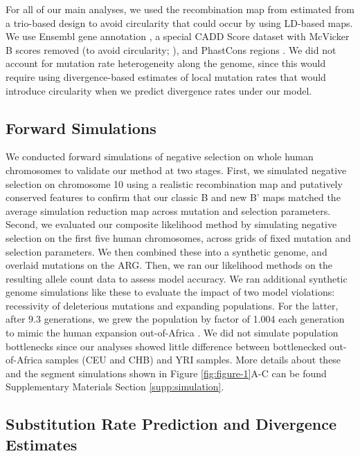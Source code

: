 \documentclass[11pt]{article}
\begin{document}
For all of our main analyses, we used the recombination map from
\textcite{Halldorsson2019-ey} estimated from a trio-based design to avoid
circularity that could occur by using LD-based maps. We use Ensembl gene
annotation \parencite{Cunningham2022-vk}, a special CADD Score dataset with
McVicker B scores removed (to avoid circularity;
\cite{Kircher2014-bv,Rentzsch2019-lr}), and PhastCons regions
\parencite{Siepel2005-wh}. We did not account for mutation rate heterogeneity
along the genome, since this would require using divergence-based estimates of
local mutation rates that would introduce circularity when we predict
divergence rates under our model.

\subsection*{Forward Simulations}
\label{sec:methods-sim}

We conducted forward simulations of negative selection on whole human
chromosomes to validate our method at two stages. First, we simulated negative
selection on chromosome 10 using a realistic recombination map and putatively
conserved features to confirm that our classic B and new B' maps matched the
average simulation reduction map across mutation and selection parameters.
Second, we evaluated our composite likelihood method by simulating negative
selection on the first five human chromosomes, across grids of fixed mutation
and selection parameters. We then combined these into a synthetic genome, and
overlaid mutations on the ARG. Then, we ran our likelihood methods on the
resulting allele count data to assess model accuracy. We ran additional
synthetic genome simulations like these to evaluate the impact of two model
violations: recessivity of deleterious mutations and expanding populations. For
the latter, after $9.3$ generations, we grew the population by factor of 1.004
each generation to mimic the human expansion out-of-Africa
\parencite{Gutenkunst2009-pg}. We did not simulate population bottlenecks since
our analyses showed little difference between bottlenecked out-of-Africa
samples (CEU and CHB) and YRI samples. More details about these and the segment
simulations shown in Figure \ref{fig:figure-1}A-C can be found Supplementary
Materials Section \ref{supp:simulation}.

\subsection*{Substitution Rate Prediction and Divergence Estimates}
\label{sec:methods-sub}
\end{document}
